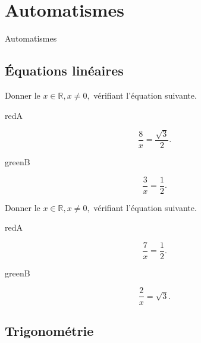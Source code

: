 \documentclass[14pt]{beamer}
\newcommand{\R}{\mathbb{R}}
\begin{document}
\section{Automatismes}

\begin{frame}

\centering \huge
Automatismes

\end{frame}

\subsection{Équations linéaires}

\begin{frame}{1}
	Donner le $x\in\R, x\neq0,$ vérifiant l'équation suivante.
	
		\begin{mybox}{red}{A}
		\begin{center}
			\[ \dfrac8x  =\dfrac{\sqrt{3}}2. \]
		\end{center}
		\end{mybox}
		\begin{mybox}{green}{B}
		\begin{center}
			\[ \dfrac3x = \dfrac12. \]
		\end{center}
		\end{mybox}

\end{frame}


\begin{frame}{2}
	Donner le $x\in\R, x\neq0,$ vérifiant l'équation suivante.
	
		\begin{mybox}{red}{A}
		\begin{center}
			\[ \dfrac7x  =\dfrac12. \]
		\end{center}
		\end{mybox}
		\begin{mybox}{green}{B}
		\begin{center}
			\[ \dfrac2x =\sqrt{3}. \]
		\end{center}
		\end{mybox}
\end{frame}

\subsection{Trigonométrie}
\end{document}
